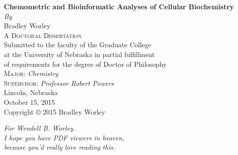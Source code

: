 \documentclass[letterpaper,twoside,openright]{report}
\begin{document}

\begin{titlepage}
\begin{center}

\textbf{
  \huge Chemometric and Bioinformatic Analyses of Cellular Biochemistry
}
\\[20pt]

\emph{By} \\[12pt] {\large Bradley Worley} \\[40pt]

\textsc{A Doctoral Dissertation} \\[40pt]

Submitted to the faculty of the Graduate College \\
at the University of Nebraska in partial fulfillment \\
of requirements for the degree of Doctor of Philosophy
\\[80pt]

\textsc{Major:}
\emph{Chemistry} \\[20pt]

\textsc{Supervisor:}
\emph{Professor Robert Powers} \\[20pt]

Lincoln, Nebraska \\
{\large October 15, 2015}
\\[180pt]

Copyright \copyright{} 2015 Bradley Worley

\clearpage
\thispagestyle{empty}
\emph{
  \large For Wendell B. Worley. \\
  I hope you have PDF viewers in heaven, \\
  because you'd really love reading this. \\
}

\end{center}
\end{titlepage}
\end{document}
